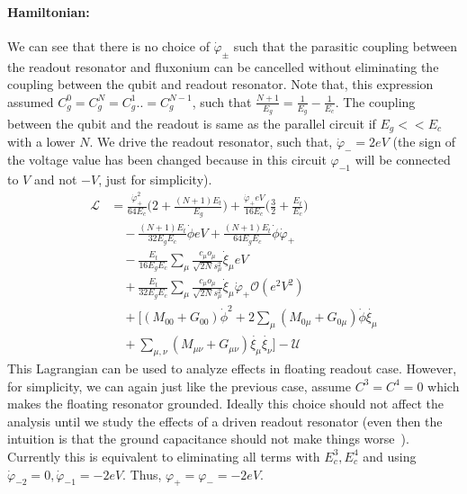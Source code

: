 \documentclass[%
reprint,
superscriptaddress,
 amsmath,amssymb,
 aps,
 prx,
longbibliography,
floatfix,
]{revtex4-2}
\newcommand{\sh}[1]{{\color{orange}{{}[SS: #1]}}}%
\begin{document}
\paragraph{Hamiltonian:} We can see that there is no choice of $\dot{\varphi}_{\pm}$ such that the parasitic coupling between the readout resonator and fluxonium can be cancelled without eliminating the coupling between the qubit and readout resonator. Note that, this expression assumed $C_g^0=C_g^N=C_g^1..=C_g^{N-1}$, such that  $\frac{N+1}{E_g}=\frac{1}{E_g}-\frac{1}{E_c}$. The coupling between the qubit and the readout is same as the parallel circuit if $E_g<<E_c$ with a lower $N$. We drive the readout resonator, such that, $\dot{\varphi}_{-}=2eV$ (the sign of the voltage value has been changed because in this circuit $\varphi_{-1}$ will be connected to $V$ and not $-V$, just for simplicity).\sh{Check the sign of the eV terms}
\begin{align}
    \mathcal{L}&=\frac{\dot{\varphi}_{+}^2}{64E_c}\Big(2+\frac{(N+1)E_t}{E_g}\Big)+\frac{\dot{\varphi}_{+}eV}{16E_c}\Big(\frac{3}{2}+\frac{E_t}{E_c}\Big)\nonumber\\
    &\quad-\frac{(N+1)E_t}{32E_gE_c}\dot{\phi}eV+\frac{(N+1)E_t}{64E_gE_c}\dot{\phi}\dot{\varphi}_{+}\nonumber\\
    &\quad -\frac{E_t}{16E_gE_c} \sum_\mu\frac{c_\mu o_\mu}{\sqrt{2N}s_\mu^2}  \dot{\xi}_\mu eV\nonumber\\
    &\quad+\frac{E_t}{32E_gE_c} \sum_\mu\frac{c_\mu o_\mu}{\sqrt{2N}s_\mu^2}  \dot{\xi}_\mu\dot{\varphi}_{+}\mathcal{O}(e^2V^2)\nonumber\\
    &\quad+\Big[(M_{00}+G_{00})\dot{\phi}^2+2\sum_{\mu}(M_{0\mu}+G_{0\mu})\dot{\phi}\dot{\xi_\mu}\nonumber\\
    &\quad+\sum_{\mu,\nu}(M_{\mu\nu}+G_{\mu\nu})\dot{\xi_\mu}\dot{\xi_\nu}\Big]-\mathcal{U}
\end{align}
This Lagrangian can be used to analyze effects in floating readout case. However, for simplicity, we can again just like the previous case, assume $C^3=C^4=0$ which makes the floating resonator grounded. Ideally this choice should not affect the analysis until we study the effects of a driven readout resonator (even then the intuition is that the ground capacitance should not make things worse~\sh{Check this intuition when analyzing a driven resonator. Also, we can check if changing $C_g^N=E_C^2=E+C^1$ brings the effect of Floating resonator closer to a parallel circuit. It will never be similar because we have one less ground capacitance term here.}). Currently this is equivalent to eliminating all terms with $E_c^3, E_c^4$ and using $\dot \varphi_{-2}=0, \dot\varphi_{-1}=-2eV$. Thus, $\varphi_{+}=\varphi_{-}=-2eV$. 
\end{document}
